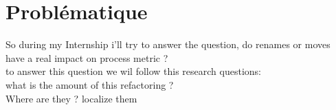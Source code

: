 \section{Problématique}
\label{sec:problematique}
So during my Internship i’ll try to answer the question, do renames or moves have a real impact on process metric ?\\
to answer this question we wil follow this research questions: \\
 what is the amount of this refactoring ?\\
 Where are they ? localize them\\
